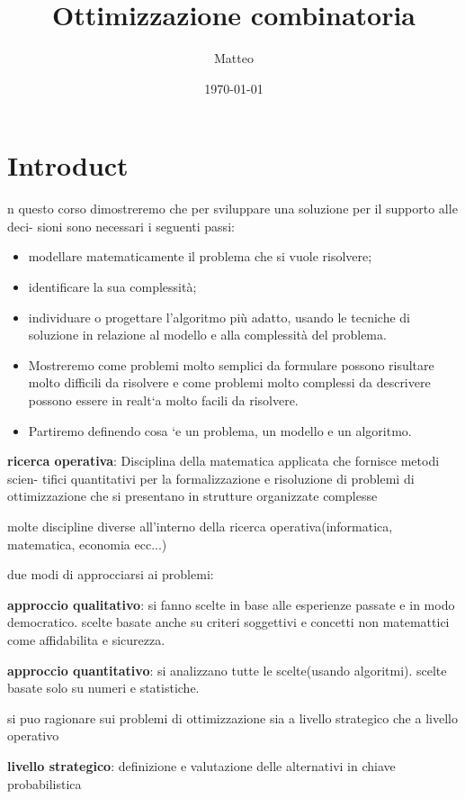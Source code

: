 \documentclass[12pt]{article}
\title{Ottimizzazione combinatoria}
\author{Matteo}
\date{\today}
\begin{document}
\maketitle

\section{Introduct}

n questo corso dimostreremo che per sviluppare una soluzione per il supporto alle deci-
sioni sono necessari i seguenti passi:
\begin{itemize}
\item modellare matematicamente il problema che si vuole risolvere;
\item identificare la sua complessità;
\item individuare o progettare l’algoritmo più adatto, usando le tecniche di soluzione in
relazione al modello e alla complessità del problema.
\item Mostreremo come problemi molto semplici da formulare possono risultare molto
difficili da risolvere e come problemi molto complessi da descrivere possono essere
in realt`a molto facili da risolvere.
\item Partiremo definendo cosa `e un problema, un modello e un algoritmo.

\end{itemize}

\textbf{ricerca operativa}: Disciplina della matematica applicata che fornisce metodi scien-
tifici quantitativi per la formalizzazione e risoluzione di problemi di ottimizzazione che si
presentano in strutture organizzate complesse

molte discipline diverse all'interno della ricerca operativa(informatica, matematica, economia ecc...)

due modi di approcciarsi ai problemi:

\textbf{approccio qualitativo}: si fanno scelte in base alle esperienze passate e in modo democratico. scelte basate anche su criteri soggettivi e concetti non matemattici come affidabilita e sicurezza.

\textbf{approccio quantitativo}: si analizzano tutte le scelte(usando algoritmi). scelte basate solo su numeri e statistiche.

si puo ragionare sui problemi di ottimizzazione sia a livello strategico che a livello operativo

\textbf{livello strategico}: definizione e valutazione delle alternativi in chiave probabilistica
\end{document}
